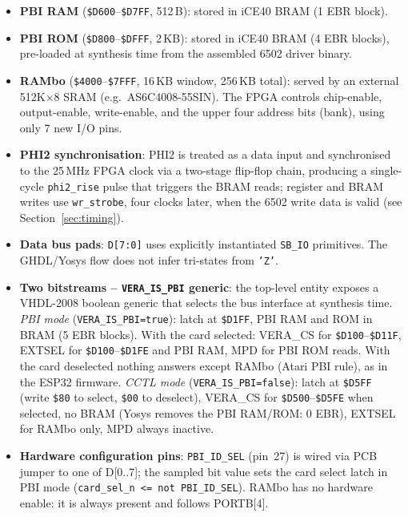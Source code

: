 \documentclass[11pt,a4paper]{article}
\newcommand{\cmd}[1]{\texttt{#1}}
\newcommand{\sig}[1]{\texttt{#1}}
\newcommand{\hex}[1]{\texttt{\$#1}}
\begin{document}
\begin{itemize}[noitemsep]
    \item \textbf{PBI RAM} (\hex{D600}--\hex{D7FF}, 512\,B): stored in
          iCE40 BRAM (1 EBR block).
    \item \textbf{PBI ROM} (\hex{D800}--\hex{DFFF}, 2\,KB): stored in
          iCE40 BRAM (4 EBR blocks), pre-loaded at synthesis time from
          the assembled 6502 driver binary.
    \item \textbf{RAMbo} (\hex{4000}--\hex{7FFF}, 16\,KB window,
          256\,KB total): served by an external 512K$\times$8 SRAM
          (e.g.\ AS6C4008-55SIN).  The FPGA controls chip-enable,
          output-enable, write-enable, and the upper four address bits
          (bank), using only 7 new I/O pins.
    \item \textbf{PHI2 synchronisation}: PHI2 is treated as a data input
          and synchronised to the 25\,MHz FPGA clock via a two-stage
          flip-flop chain, producing a single-cycle \cmd{phi2\_rise}
          pulse that triggers the BRAM reads; register and BRAM writes
          use \cmd{wr\_strobe}, four clocks later, when the 6502 write
          data is valid (see Section~\ref{sec:timing}).
    \item \textbf{Data bus pads}: \sig{D[7:0]} uses explicitly
          instantiated \cmd{SB\_IO} primitives.  The GHDL/Yosys flow
          does not infer tri-states from \texttt{'Z'}.
    \item \textbf{Two bitstreams -- \cmd{VERA\_IS\_PBI} generic}: the
          top-level entity exposes a VHDL-2008 boolean generic that
          selects the bus interface at synthesis time.
          \emph{PBI mode} (\cmd{VERA\_IS\_PBI=true}): latch at
          \hex{D1FF}, PBI RAM and ROM in BRAM (5 EBR blocks).  With the
          card selected: VERA\_CS for \hex{D100}--\hex{D11F}, EXTSEL for
          \hex{D100}--\hex{D1FE} and PBI RAM, MPD for PBI ROM reads.
          With the card deselected nothing answers except RAMbo (Atari
          PBI rule), as in the ESP32 firmware.
          \emph{CCTL mode} (\cmd{VERA\_IS\_PBI=false}): latch at
          \hex{D5FF} (write \texttt{\$80} to select, \texttt{\$00}
          to deselect), VERA\_CS for \hex{D500}--\hex{D5FE} when
          selected, no BRAM (Yosys removes the PBI RAM/ROM: 0 EBR),
          EXTSEL for RAMbo only, MPD always inactive.
    \item \textbf{Hardware configuration pins}: \sig{PBI\_ID\_SEL}
          (pin~27) is wired via PCB jumper to one of D[0..7]; the
          sampled bit value sets the card select latch in PBI mode
          (\cmd{card\_sel\_n <= not PBI\_ID\_SEL}).
          RAMbo has no hardware enable: it is always present and
          follows PORTB[4].
\end{itemize}
\end{document}
